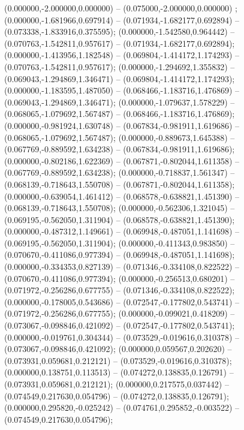  (0.000000,-2.000000,0.000000) -- (0.075000,-2.000000,0.000000) ;
 (0.000000,-1.681966,0.697914) -- (0.071934,-1.682177,0.692894) -- (0.073338,-1.833916,0.375595);
 (0.000000,-1.542580,0.964442) -- (0.070763,-1.542811,0.957617) -- (0.071934,-1.682177,0.692894);
 (0.000000,-1.413956,1.182548) -- (0.069804,-1.414172,1.174293) -- (0.070763,-1.542811,0.957617);
 (0.000000,-1.294692,1.355832) -- (0.069043,-1.294869,1.346471) -- (0.069804,-1.414172,1.174293);
 (0.000000,-1.183595,1.487050) -- (0.068466,-1.183716,1.476869) -- (0.069043,-1.294869,1.346471);
 (0.000000,-1.079637,1.578229) -- (0.068065,-1.079692,1.567487) -- (0.068466,-1.183716,1.476869);
 (0.000000,-0.981924,1.630748) -- (0.067834,-0.981911,1.619686) -- (0.068065,-1.079692,1.567487);
 (0.000000,-0.889673,1.645388) -- (0.067769,-0.889592,1.634238) -- (0.067834,-0.981911,1.619686);
 (0.000000,-0.802186,1.622369) -- (0.067871,-0.802044,1.611358) -- (0.067769,-0.889592,1.634238);
 (0.000000,-0.718837,1.561347) -- (0.068139,-0.718643,1.550708) -- (0.067871,-0.802044,1.611358);
 (0.000000,-0.639054,1.461412) -- (0.068578,-0.638821,1.451390) -- (0.068139,-0.718643,1.550708);
 (0.000000,-0.562306,1.321045) -- (0.069195,-0.562050,1.311904) -- (0.068578,-0.638821,1.451390);
 (0.000000,-0.487312,1.149661) -- (0.069948,-0.487051,1.141698) -- (0.069195,-0.562050,1.311904);
 (0.000000,-0.411343,0.983850) -- (0.070670,-0.411086,0.977394) -- (0.069948,-0.487051,1.141698);
 (0.000000,-0.334353,0.827139) -- (0.071346,-0.334108,0.822522) -- (0.070670,-0.411086,0.977394);
 (0.000000,-0.256513,0.680201) -- (0.071972,-0.256286,0.677755) -- (0.071346,-0.334108,0.822522);
 (0.000000,-0.178005,0.543686) -- (0.072547,-0.177802,0.543741) -- (0.071972,-0.256286,0.677755);
 (0.000000,-0.099021,0.418209) -- (0.073067,-0.098846,0.421092) -- (0.072547,-0.177802,0.543741);
 (0.000000,-0.019761,0.304344) -- (0.073529,-0.019616,0.310378) -- (0.073067,-0.098846,0.421092);
 (0.000000,0.059567,0.202620) -- (0.073931,0.059681,0.212121) -- (0.073529,-0.019616,0.310378);
 (0.000000,0.138751,0.113513) -- (0.074272,0.138835,0.126791) -- (0.073931,0.059681,0.212121);
 (0.000000,0.217575,0.037442) -- (0.074549,0.217630,0.054796) -- (0.074272,0.138835,0.126791);
 (0.000000,0.295820,-0.025242) -- (0.074761,0.295852,-0.003522) -- (0.074549,0.217630,0.054796);
